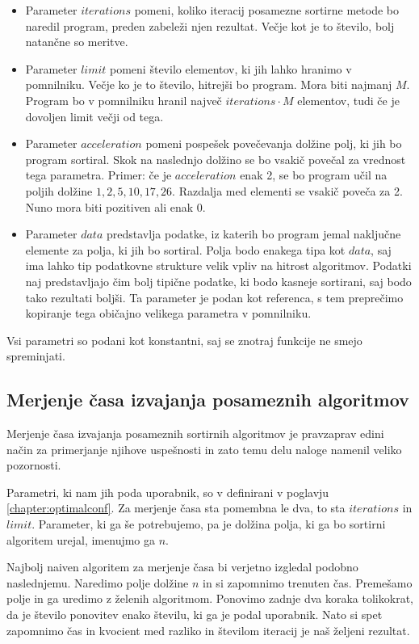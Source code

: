 \documentclass[a4paper,oneside,12pt]{article}
\begin{document}
\begin{itemize}
  \item Parameter $iterations$ pomeni, koliko iteracij posamezne sortirne metode bo naredil
    program, preden zabeleži njen rezultat. Večje kot je to število, bolj natančne so
    meritve.
  \item Parameter $limit$ pomeni število elementov, ki jih lahko hranimo v pomnilniku.
    Večje ko je to število, hitrejši bo program. Mora biti najmanj $M$. Program bo v
    pomnilniku hranil največ $iterations \cdot M$ elementov, tudi če je dovoljen limit večji od
    tega.
  \item Parameter $acceleration$ pomeni pospešek povečevanja dolžine polj, ki jih bo
    program sortiral. Skok na naslednjo dolžino se bo vsakič povečal za vrednost tega
    parametra. Primer: če je $acceleration$ enak 2, se bo program učil na poljih dolžine
    $1, 2, 5, 10, 17, 26$. Razdalja med elementi se vsakič poveča za 2. Nuno mora biti
    pozitiven ali enak $0$.
  \item Parameter $data$ predstavlja podatke, iz katerih bo program jemal naključne
    elemente za polja, ki jih bo sortiral. Polja bodo enakega tipa kot $data$, saj ima
    lahko tip podatkovne strukture velik vpliv na hitrost algoritmov. Podatki naj
    predstavljajo čim bolj tipične podatke, ki bodo kasneje sortirani, saj bodo tako
    rezultati boljši. Ta parameter je podan kot referenca, s tem preprečimo kopiranje
    tega običajno velikega parametra v pomnilniku.
\end{itemize}
Vsi parametri so podani kot konstantni, saj se znotraj funkcije ne smejo spreminjati. 

\subsection{Merjenje časa izvajanja posameznih algoritmov}
Merjenje časa izvajanja posameznih sortirnih algoritmov je pravzaprav edini način za
primerjanje njihove uspešnosti in zato temu delu naloge namenil veliko pozornosti.

Parametri, ki nam jih poda uporabnik, so v definirani v poglavju
\ref{chapter:optimalconf}. Za merjenje časa sta pomembna le dva, to sta $iterations$ in
$limit$. Parameter, ki ga še potrebujemo, pa je dolžina polja, ki ga bo sortirni algoritem
urejal, imenujmo ga $n$.

Najbolj naiven algoritem za merjenje časa bi verjetno izgledal podobno naslednjemu. 
Naredimo polje dolžine $n$ in si zapomnimo trenuten čas. Premešamo polje in ga
uredimo z želenih algoritmom. Ponovimo zadnje dva koraka tolikokrat, da je število
ponovitev enako številu, ki ga je podal uporabnik. Nato si spet zapomnimo čas in kvocient
med razliko in številom iteracij je naš željeni rezultat.
\end{document}
